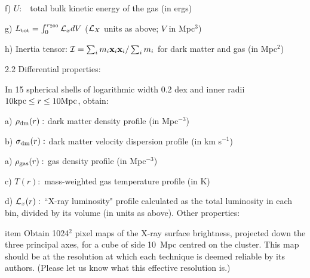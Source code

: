 \qquad        f) $U:$ \quad \    total bulk kinetic energy of the gas (in ergs) 

\qquad        g) $L_{\rm tot}= \int_0^{r_{200}} {\cal L}_x dV$ (${\cal
                  L}_X$ units as above; $V$ in Mpc$^{3}$)

\qquad        h) Inertia tensor: ${\cal I} = \sum_i m_i {\bf x}_i {\bf
                 x}_i /\sum_i m_i$ for dark matter and gas (in Mpc$^2$) 

2.2 Differential properties:
 
\qquad        In 15 spherical shells of logarithmic width 0.2 dex and inner
              radii $10 {\rm kpc} \le r \le 10 {\rm Mpc}$, obtain:

\qquad	a) $\rho_{\rm dm}(r):$    dark matter density profile (in \Mo
                                  Mpc$^{-3}$) 

\qquad	b) $\sigma_{\rm dm}(r):$  dark matter velocity dispersion profile
                                  (in km s$^{-1}$) 

\qquad	a) $\rho_{\rm gas}(r):$   gas density profile (in \Mo Mpc$^{-3}$)

\qquad	c) $T(r):$ \quad           mass-weighted gas temperature profile (in K)

\qquad	d) ${\cal L}_x(r):$        ``X-ray  luminosity" profile
                       calculated as the total luminosity in each bin, 
                       divided by its volume (in units as above).
\vfill{} Other properties:

\qquad \1item  Obtain 1024$^2$ pixel maps of the X-ray surface brightness, 
	   projected down the three principal axes, for a cube of side 
           10~Mpc centred on the cluster. This map should be at the
           resolution at which each technique is deemed reliable by its 
           authors. (Please let us know what this effective resolution is.) 

\vfill\eject\bye 


